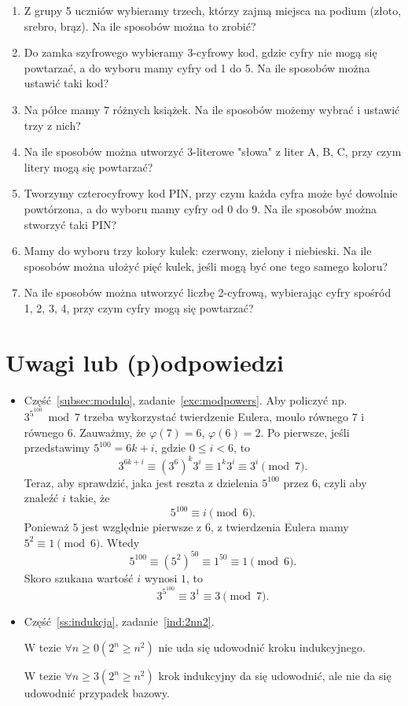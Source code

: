 \documentclass[12pt]{article}
\begin{document}
\begin{enumerate}
	\item 
	Z grupy 5 uczniów wybieramy trzech, którzy zajmą miejsca na podium (złoto, srebro, brąz). Na ile sposobów można to zrobić?
	\item 
	Do zamka szyfrowego wybieramy 3-cyfrowy kod, gdzie cyfry nie mogą się powtarzać, a do wyboru mamy cyfry od 1 do 5. Na ile sposobów można ustawić taki kod?
	\item 
	Na półce mamy 7 różnych książek. Na ile sposobów możemy wybrać i ustawić trzy z nich?
	\item 
	Na ile sposobów można utworzyć 3-literowe "słowa" z liter A, B, C, przy czym litery mogą się powtarzać?
	\item 
	Tworzymy czterocyfrowy kod PIN, przy czym każda cyfra może być dowolnie powtórzona, a do wyboru mamy cyfry od 0 do 9. Na ile sposobów można stworzyć taki PIN?
	\item 
	Mamy do wyboru trzy kolory kulek: czerwony, zielony i niebieski. Na ile sposobów można ułożyć pięć kulek, jeśli mogą być one tego samego koloru?
	\item 
	Na ile sposobów można utworzyć liczbę 2-cyfrową, wybierając cyfry spośród 1, 2, 3, 4, przy czym cyfry mogą się powtarzać?
\end{enumerate} 



\section{Uwagi lub (p)odpowiedzi}


\begin{itemize}
	\item Część~\ref{subsec:modulo}, zadanie~\ref{exc:modpowers}.
	Aby policzyć np. $3^{5^100} \bmod 7$ trzeba wykorzystać 
	twierdzenie Eulera, moulo równego $7$ i równego $6$.
	Zauważmy, że $\varphi(7)=6$, $\varphi(6)=2$.
	Po pierwsze, jeśli przedstawimy $5^{100} = 6k+i$, gdzie $0\leq i<6$, to 
	\[
	3^{6k+i} \equiv (3^6)^k3^i \equiv 1^k3^i \equiv 3^i \pmod 7.
	\]
	Teraz, aby sprawdzić, jaka jest reszta z dzielenia $5^100$ przez $6$, czyli aby znaleźć $i$ takie, że 
	\[
	5^{100}\equiv i \pmod 6.
	\]
	Ponieważ $5$ jest względnie pierwsze z $6$, z twierdzenia Eulera mamy $5^2 \equiv 1 \pmod 6$.
	Wtedy 
	\[
	5^100 \equiv (5^2)^{50} \equiv 1^{50} \equiv 1 \pmod 6.
	\]
	Skoro szukana wartość $i$ wynosi $1$, to 
	\[
	3^{5^{100}} \equiv 3^1 \equiv 3 \pmod 7.
	\]
    \item Część~\ref{ss:indukcja}, zadanie~\ref{ind:2nn2}. 
     
     W tezie $\forall n\geq 0 (2^n\geq n^2)$ nie uda się 
     udowodnić kroku indukcyjnego.
     
     W tezie $\forall n\geq 3 (2^n\geq n^2)$ krok indukcyjny da się udowodnić, ale nie da się udowodnić przypadek bazowy.
\end{itemize}

\nocite{Jongsma2019}



\end{document}
